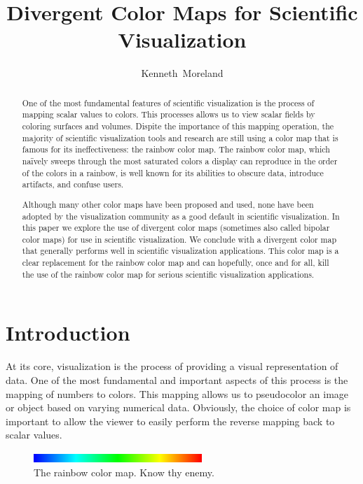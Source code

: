\documentclass[twocolumn]{article}
\title{Divergent Color Maps for Scientific Visualization}
\author{Kenneth~Moreland}
\begin{document}
\maketitle

\begin{abstract}
  One of the most fundamental features of scientific visualization is the
  process of mapping scalar values to colors.  This processes allows us to
  view scalar fields by coloring surfaces and volumes.  Dispite the
  importance of this mapping operation, the majority of scientific
  visualization tools and research are still using a color map that is
  famous for its ineffectiveness: the rainbow color map.  The rainbow color
  map, which na\"{i}vely sweeps through the most saturated colors a display
  can reproduce in the order of the colors in a rainbow, is well known for
  its abilities to obscure data, introduce artifacts, and confuse users.

  Although many other color maps have been proposed and used, none have
  been adopted by the visualization community as a good default in
  scientific visualization.  In this paper we explore the use of divergent
  color maps (sometimes also called bipolar color maps) for use in
  scientific visualization.  We conclude with a divergent color map that
  generally performs well in scientific visualization applications.  This
  color map is a clear replacement for the rainbow color map and can
  hopefully, once and for all, kill the use of the rainbow color map for
  serious scientific visualization applications.
\end{abstract}

\section{Introduction}
\label{sec:Introduction}

At its core, visualization is the process of providing a visual
representation of data.  One of the most fundamental and important aspects
of this process is the mapping of numbers to colors.  This mapping allows
us to pseudocolor an image or object based on varying numerical data.
Obviously, the choice of color map is important to allow the viewer to
easily perform the reverse mapping back to scalar values.

\begin{figure}
  \centering
  \includegraphics[width=2.5in]{images/RainbowBar}
  \caption{The rainbow color map.  Know thy enemy.}
  \label{fig:RainbowColorMap}
\end{figure}
\end{document}
